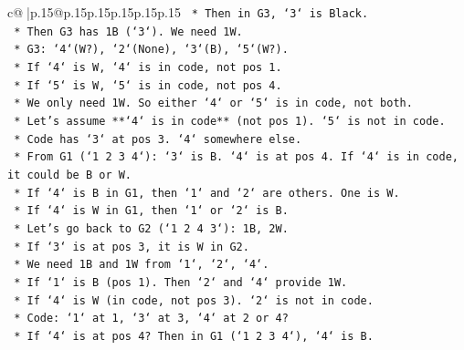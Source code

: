 \documentclass{article}
\begin{document}
{\begin{supertabular}{c@{$\;$}|p{.15\linewidth}@{}p{.15\linewidth}p{.15\linewidth}p{.15\linewidth}p{.15\linewidth}p{.15\linewidth}}
{{{\texttt{                                            *   Then in G3, `3` is Black.} \\
\texttt{                                            *   Then G3 has 1B (`3`). We need 1W.} \\
\texttt{                                            *   G3: `4`(W?), `2`(None), `3`(B), `5`(W?).} \\
\texttt{                                            *   If `4` is W, `4` is in code, not pos 1.} \\
\texttt{                                            *   If `5` is W, `5` is in code, not pos 4.} \\
\texttt{                                            *   We only need 1W. So either `4` or `5` is in code, not both.} \\
\texttt{                                            *   Let's assume **`4` is in code** (not pos 1). `5` is not in code.} \\
\texttt{                                            *   Code has `3` at pos 3. `4` somewhere else.} \\
\texttt{                                            *   From G1 (`1 2 3 4`): `3` is B. `4` is at pos 4. If `4` is in code, it could be B or W.} \\
\texttt{                                            *   If `4` is B in G1, then `1` and `2` are others. One is W.} \\
\texttt{                                            *   If `4` is W in G1, then `1` or `2` is B.} \\
\texttt{                                            *   Let's go back to G2 (`1 2 4 3`): 1B, 2W.} \\
\texttt{                                            *   If `3` is at pos 3, it is W in G2.} \\
\texttt{                                            *   We need 1B and 1W from `1`, `2`, `4`.} \\
\texttt{                                            *   If `1` is B (pos 1). Then `2` and `4` provide 1W.} \\
\texttt{                                            *   If `4` is W (in code, not pos 3). `2` is not in code.} \\
\texttt{                                            *   Code: `1` at 1, `3` at 3, `4` at 2 or 4?} \\
\texttt{                                            *   If `4` is at pos 4? Then in G1 (`1 2 3 4`), `4` is B.} \\
}}}
\end{supertabular}}
\end{document}
